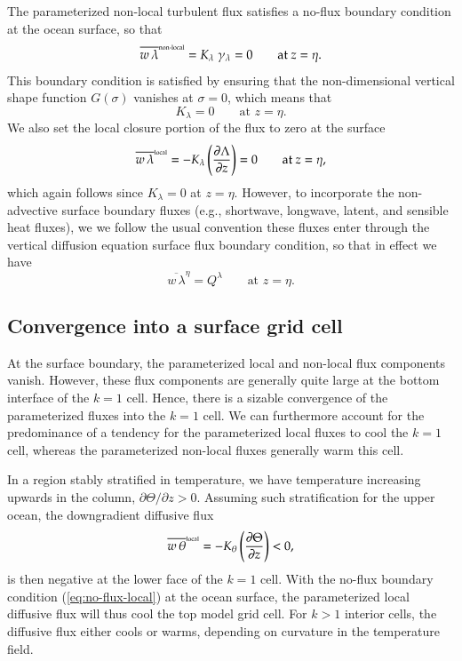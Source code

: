 The parameterized non-local turbulent flux satisfies a no-flux
boundary condition at the ocean surface, so that
\begin{equation}
  \overline{w \, \lambda}^{\mbox{\tiny non-local}} = K_{\lambda} \;  \gamma_{\lambda}  = 0 \qquad \mbox{at $z=\eta$}.
\label{eq:non-local-surface-bc}
\end{equation}
This boundary condition is satisfied by ensuring that the
non-dimensional vertical shape function $G(\sigma)$ vanishes at
$\sigma = 0$, which means that
\begin{equation}
   K_{\lambda}  = 0   \qquad \mbox{at $z=\eta$}.
\end{equation}
We also set the local closure portion of the flux to zero at the
surface
\begin{equation}
\overline{w \, \lambda}^{\mbox{\tiny local}} = -K_{\lambda} \left( \frac{\partial \Lambda}{\partial z} \right) = 
 0  \qquad \mbox{at $z=\eta$},
\label{eq:no-flux-local}
\end{equation}
which again follows since $K_{\lambda} = 0$ at $z=\eta$.  However, to
incorporate the non-advective surface boundary fluxes (e.g.,
shortwave, longwave, latent, and sensible heat fluxes), we we follow
the usual convention these fluxes enter through the vertical diffusion
equation surface flux boundary condition, so that in effect we have
\begin{equation}
\overline{w \, \lambda}^{\eta}  = Q^{\lambda}  \qquad \mbox{at $z=\eta$}. 
\label{eq:surface-boundary-flux}
\end{equation}


\subsection{Convergence into a surface grid cell}
\label{subsection:kpp-surface-cell-tendency}

At the surface boundary, the parameterized local and non-local flux
components vanish.  However, these flux components are generally quite
large at the bottom interface of the $k=1$ cell.  Hence, there is a
sizable convergence of the parameterized fluxes into the $k=1$ cell.
We can furthermore account for the predominance of a tendency for the
parameterized local fluxes to cool the $k=1$ cell, whereas the
parameterized non-local fluxes generally warm this cell.

In a region stably stratified in temperature, we have temperature
increasing upwards in the column, $\partial \Theta / \partial z >
0$. Assuming such stratification for the upper ocean, the downgradient
diffusive flux
\begin{equation}
\overline{w \, \theta}^{\mbox{\tiny local}} = -K_{\theta} \left( \frac{\partial \Theta}{\partial z} \right) < 0,
\end{equation}
is then negative at the lower face of the $k=1$ cell.  With the
no-flux boundary condition (\ref{eq:no-flux-local}) at the ocean
surface, the parameterized local diffusive flux will thus cool the top
model grid cell. For $k > 1$ interior cells, the diffusive flux either
cools or warms, depending on curvature in the temperature field.

